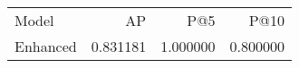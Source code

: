 \begin{tabular}{lrrr}
Model & AP & P@5 & P@10 \\
Enhanced & 0.831181 & 1.000000 & 0.800000 \\
\end{tabular}
